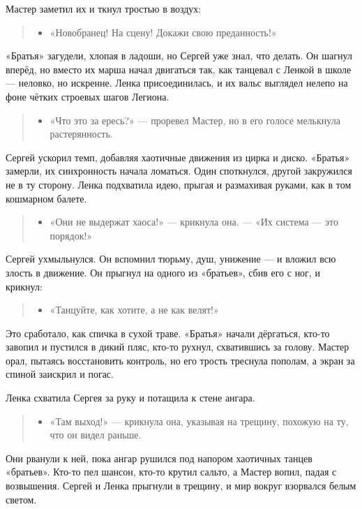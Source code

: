 \documentclass[12pt,a4paper]{book}
\newenvironment{dialogue}{\begin{quote}\itshape\begin{itemize}\item[]}{\end{itemize}\end{quote}}
\begin{document}
Мастер заметил их и ткнул тростью в воздух:

\begin{dialogue}
«Новобранец! На сцену! Докажи свою преданность!»
\end{dialogue}

«Братья» загудели, хлопая в ладоши, но Сергей уже знал, что делать. Он шагнул вперёд, но вместо их марша начал двигаться так, как танцевал с Ленкой в школе --- неловко, но искренне. Ленка присоединилась, и их вальс выглядел нелепо на фоне чётких строевых шагов Легиона.

\begin{dialogue}
«Что это за ересь?» --- проревел Мастер, но в его голосе мелькнула растерянность.
\end{dialogue}

Сергей ускорил темп, добавляя хаотичные движения из цирка и диско. «Братья» замерли, их синхронность начала ломаться. Один споткнулся, другой закружился не в ту сторону. Ленка подхватила идею, прыгая и размахивая руками, как в том кошмарном балете.

\begin{dialogue}
«Они не выдержат хаоса!» --- крикнула она. --- «Их система — это порядок!»
\end{dialogue}

Сергей ухмыльнулся. Он вспомнил тюрьму, душ, унижение --- и вложил всю злость в движение. Он прыгнул на одного из «братьев», сбив его с ног, и крикнул:

\begin{dialogue}
«Танцуйте, как хотите, а не как велят!»
\end{dialogue}

Это сработало, как спичка в сухой траве. «Братья» начали дёргаться, кто-то завопил и пустился в дикий пляс, кто-то рухнул, схватившись за голову. Мастер орал, пытаясь восстановить контроль, но его трость треснула пополам, а экран за спиной заискрил и погас.

Ленка схватила Сергея за руку и потащила к стене ангара.

\begin{dialogue}
«Там выход!» --- крикнула она, указывая на трещину, похожую на ту, что он видел раньше.
\end{dialogue}

Они рванули к ней, пока ангар рушился под напором хаотичных танцев «братьев». Кто-то пел шансон, кто-то крутил сальто, а Мастер вопил, падая с возвышения. Сергей и Ленка прыгнули в трещину, и мир вокруг взорвался белым светом.
\end{document}

